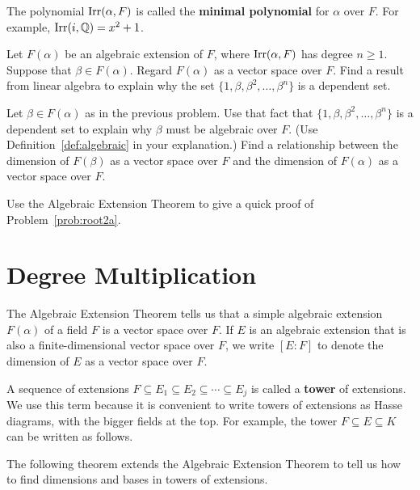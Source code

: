 The polynomial $\operatorname{Irr}(\alpha, F)$ is called the \textbf{minimal polynomial} for $\alpha$ over $F$. For example, $\operatorname{Irr}(i, \mathbb{Q}) = x^2 + 1$.

\begin{problem}
Let $F(\alpha)$ be an algebraic extension of $F$, where $\operatorname{Irr}(\alpha, F)$ has degree $n\geq 1$.  Suppose that $\beta \in F(\alpha)$.  Regard $F(\alpha)$ as a vector space over $F$. Find a result from linear algebra to explain why the set $\{1, \beta, \beta^2, \ldots, \beta^n\}$ is a dependent set.
\end{problem}

\begin{problem}
Let $\beta \in F(\alpha)$ as in the previous problem.
Use that fact that $\{1, \beta, \beta^2, \ldots, \beta^n\}$ is a dependent set to explain why $\beta$ must be algebraic over $F$. (Use Definition~\ref{def:algebraic} in your explanation.) Find a relationship between the dimension of $F(\beta)$ as a vector space over $F$ and the dimension of $F(\alpha)$ as a vector space over $F$.
\end{problem}

\begin{problem}
    Use the Algebraic Extension Theorem to give a quick proof of Problem~\ref{prob:root2a}.
\end{problem}

\section{Degree Multiplication}

The Algebraic Extension Theorem tells us that a simple algebraic extension $F(\alpha)$ of a field $F$ is a vector space over $F$. If $E$ is an algebraic extension that is also a finite-dimensional vector space over $F$, we write $[E : F]$ to denote the dimension of $E$ as a vector space over $F$.

A sequence of extensions $F \subseteq E_1 \subseteq E_2 \subseteq \cdots \subseteq E_j$ is called a \textbf{tower} of extensions. We use this term because it is convenient to write towers of extensions as Hasse diagrams, with the bigger fields at the top. For example, the tower $F\subseteq E \subseteq K$ can be written as follows.
\begin{annotation}
\end{annotation}
\begin{center}\small
{}
\end{center}
The following theorem extends the Algebraic Extension Theorem to tell us how to find dimensions and bases in towers of extensions.

